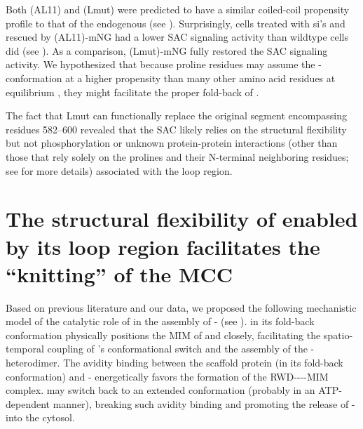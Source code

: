 Both (AL11) and (Lmut) were predicted to have a similar coiled-coil propensity profile to that of the endogenous  (see ). Surprisingly, cells treated with si's and rescued by (AL11)-mNG had a lower SAC signaling activity than wildtype cells did (see ). As a comparison, (Lmut)-mNG fully restored the SAC signaling activity. We hypothesized that because proline residues may assume the -conformation at a higher propensity than many other amino acid residues at equilibrium \cite{Ramachandran1976}, they might facilitate the proper fold-back of .

The fact that Lmut can functionally replace the original segment encompassing residues 582--600 revealed that the SAC likely relies on the structural flexibility but not phosphorylation or unknown protein-protein interactions (other than those that rely solely on the prolines and their N-terminal neighboring residues; see  for more details) associated with the loop region.

\section{The structural flexibility of  enabled by its loop region facilitates the ``knitting'' of the MCC}
\label{FinalKnittingModel}

Based on previous literature and our data, we proposed the following mechanistic model of the catalytic role of  in the assembly of - (see ).  in its fold-back conformation physically positions the MIM of  and  closely, facilitating the spatio-temporal coupling of 's conformational switch and the assembly of the - heterodimer. The avidity binding between the scaffold protein  (in its fold-back conformation) and - energetically favors the formation of the RWD----MIM complex.  may switch back to an extended conformation (probably in an ATP-dependent manner), breaking such avidity binding and promoting the release of - into the cytosol.

